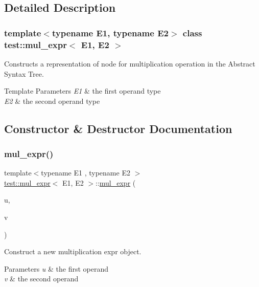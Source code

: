 \subsection{Detailed Description}
\subsubsection*{template$<$typename E1, typename E2$>$\newline
class test\+::mul\+\_\+expr$<$ E1, E2 $>$}

Constructs a representation of node for multiplication operation in the Abstract Syntax Tree. 


\begin{DoxyTemplParams}{Template Parameters}
{\em E1} & the first operand type \\
\hline
{\em E2} & the second operand type \\
\hline
\end{DoxyTemplParams}


\subsection{Constructor \& Destructor Documentation}
\mbox{\label{classtest_1_1mul__expr_ae8204767f3a1949c0281316869175e67}} 
\subsubsection{\texorpdfstring{mul\_expr()}{mul\_expr()}}
{\footnotesize\ttfamily template$<$typename E1 , typename E2 $>$ \\
\mbox{\hyperlink{classtest_1_1mul__expr}{test\+::mul\+\_\+expr}}$<$ E1, E2 $>$\+::\mbox{\hyperlink{classtest_1_1mul__expr}{mul\+\_\+expr}} (\begin{DoxyParamCaption}\item[{E1 const \&}]{u,  }\item[{E2 const \&}]{v }\end{DoxyParamCaption})\hspace{0.3cm}{\ttfamily [inline]}}



Construct a new multiplication expr object. 


\begin{DoxyParams}{Parameters}
{\em u} & the first operand \\
\hline
{\em v} & the second operand \\
\hline
\end{DoxyParams}


